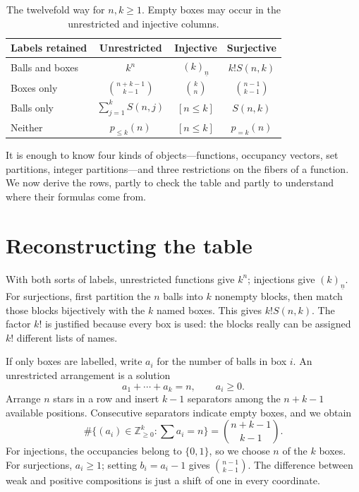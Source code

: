 \begin{table}[htbp]
 \centering
 \small
 \setlength{\tabcolsep}{5pt}
 \renewcommand{\arraystretch}{1.75}
 \begin{tabular}{@{}lccc@{}}
 \toprule
 Labels retained & Unrestricted & Injective & Surjective\\
 \midrule
 Balls and boxes &
 \(k^n\) & \((k)_{\underline n}\) & \(k!S(n,k)\)\\
 Boxes only &
 \(\binom{n+k-1}{k-1}\) & \(\binom{k}{n}\) & \(\binom{n-1}{k-1}\)\\
 Balls only &
 \(\sum_{j=1}^k S(n,j)\) & \([n\le k]\) & \(S(n,k)\)\\
 Neither &
 \(p_{\le k}(n)\) & \([n\le k]\) & \(p_{=k}(n)\)\\
 \bottomrule
 \end{tabular}
 \caption{The twelvefold way for \(n,k\ge1\). Empty boxes may occur in the unrestricted and injective columns.}
\end{table}

It is enough to know four kinds of objects---functions, occupancy vectors, set partitions, integer partitions---and three restrictions on the fibers of a function. We now derive the rows, partly to check the table and partly to understand where their formulas come from.

\section{Reconstructing the table}

With both sorts of labels, unrestricted functions give \(k^n\); injections give \((k)_{\underline n}\). For surjections, first partition the \(n\) balls into \(k\) nonempty blocks, then match those blocks bijectively with the \(k\) named boxes. This gives \(k!S(n,k)\). The factor \(k!\) is justified because every box is used: the blocks really can be assigned \(k!\) different lists of names.

If only boxes are labelled, write \(a_i\) for the number of balls in box \(i\). An unrestricted arrangement is a solution
\[
 a_1+\cdots+a_k=n,\qquad a_i\ge0.
\]
Arrange \(n\) stars in a row and insert \(k-1\) separators among the \(n+k-1\) available positions. Consecutive separators indicate empty boxes, and we obtain
\[
 \#\{(a_i)\in\mathbb Z_{\ge0}^k:\sum a_i=n\}
 =\binom{n+k-1}{k-1}.
\]
For injections, the occupancies belong to \(\{0,1\}\), so we choose \(n\) of the \(k\) boxes. For surjections, \(a_i\ge1\); setting \(b_i=a_i-1\) gives \(\binom{n-1}{k-1}\). The difference between weak and positive compositions is just a shift of one in every coordinate.

